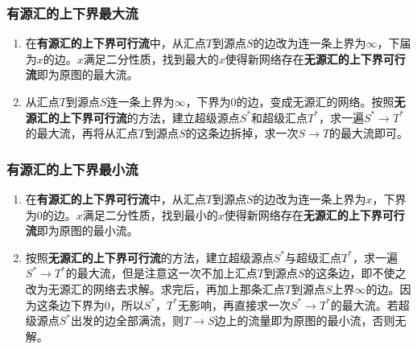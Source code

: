 \subsubsection{有源汇的上下界最大流}
\begin{enumerate}
	\item 在\textbf{有源汇的上下界可行流}中，从汇点$T$到源点$S$的边改为连一条上界为$\infty$，下届为$x$的边。$x$满足二分性质，找到最大的$x$使得新网络存在\textbf{无源汇的上下界可行流}即为原图的最大流。
	\item 从汇点$T$到源点$S$连一条上界为$\infty$，下界为$0$的边，变成无源汇的网络。按照\textbf{无源汇的上下界可行流}的方法，建立超级源点$S^*$和超级汇点$T^*$，求一遍$S^* \rightarrow T^*$的最大流，再将从汇点$T$到源点$S$的这条边拆掉，求一次$S \rightarrow T$的最大流即可。
\end{enumerate}
\subsubsection{有源汇的上下界最小流}
\begin{enumerate}
	\item 在\textbf{有源汇的上下界可行流}中，从汇点$T$到源点$S$的边改为连一条上界为$x$，下界为$0$的边。$x$满足二分性质，找到最小的$x$使得新网络存在\textbf{无源汇的上下界可行流}即为原图的最小流。
	\item 按照\textbf{无源汇的上下界可行流}的方法，建立超级源点$S^*$与超级汇点$T^*$，求一遍$S^* \rightarrow T^*$的最大流，但是注意这一次不加上汇点$T$到源点$S$的这条边，即不使之改为无源汇的网络去求解。求完后，再加上那条汇点$T$到源点$S$上界$\infty$的边。因为这条边下界为$0$，所以$S^*$，$T^*$无影响，再直接求一次$S^* \rightarrow T^*$的最大流。若超级源点$S^*$出发的边全部满流，则$T \rightarrow S$边上的流量即为原图的最小流，否则无解。
\end{enumerate}

